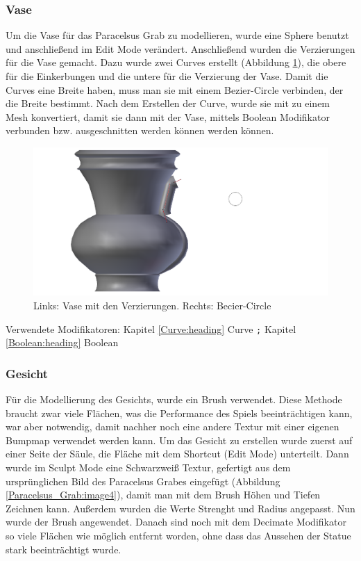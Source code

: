 \subsubsection{Vase}
Um die Vase für das Paracelsus Grab zu modellieren, wurde eine Sphere benutzt und anschließend im Edit Mode verändert. Anschließend wurden die Verzierungen für die Vase gemacht.
Dazu wurde zwei Curves erstellt (Abbildung \ref{Paracelsus_Grab:image5}), die obere für die Einkerbungen und die untere für die Verzierung der Vase. Damit die Curves eine
Breite haben, muss man sie mit einem Bezier-Circle verbinden, der die Breite bestimmt. Nach dem Erstellen der Curve,
wurde sie mit  zu einem Mesh konvertiert, damit sie dann mit der Vase, mittels Boolean Modifikator verbunden
bzw. ausgeschnitten werden können werden können.

\begin{figure}[H]
    \centering
    \includegraphics[width=.8\textwidth]{images/Paracelsus-Grab_Vase-Curve.png}
    \caption{Links: Vase mit den Verzierungen. Rechts: Becier-Circle}
    \label{Paracelsus_Grab:image5}
\end{figure}

Verwendete Modifikatoren: Kapitel \ref{Curve:heading} Curve \verb+;+ Kapitel \ref{Boolean:heading} Boolean

\subsubsection{Gesicht}
Für die Modellierung des Gesichts, wurde ein Brush verwendet. Diese Methode braucht zwar viele Flächen, was die Performance des Spiels beeinträchtigen kann, war
aber notwendig, damit nachher noch eine andere Textur mit einer eigenen Bumpmap verwendet werden kann. Um das Gesicht zu erstellen wurde zuerst auf einer Seite der Säule,
die Fläche mit dem Shortcut   (Edit Mode) unterteilt. Dann wurde im Sculpt Mode eine Schwarzweiß Textur, gefertigt aus dem ursprünglichen Bild des Paracelsus Grabes
eingefügt (Abbildung \ref{Paracelsus_Grab:image4}),
damit man mit dem Brush Höhen und Tiefen Zeichnen kann. Außerdem wurden die Werte Strenght und Radius angepasst. Nun wurde der Brush angewendet. Danach sind noch mit dem
Decimate Modifikator so viele Flächen wie möglich entfernt worden, ohne dass das Aussehen der Statue stark beeinträchtigt wurde.


